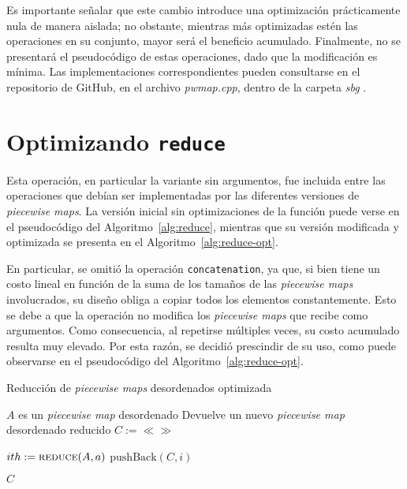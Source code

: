 Es importante señalar que este cambio introduce una optimización prácticamente nula de manera aislada; no obstante, mientras más optimizadas estén las operaciones en su conjunto, mayor será el beneficio acumulado. Finalmente, no se presentará el pseudocódigo de estas operaciones, dado que la modificación es mínima. Las implementaciones correspondientes pueden consultarse en el repositorio de GitHub, en el archivo \textit{pwmap.cpp}, dentro de la carpeta \textit{sbg} \cite{sbg}.


\section{Optimizando \texttt{reduce}}

Esta operación, en particular la variante sin argumentos, fue incluida entre las operaciones que debían ser implementadas por las diferentes versiones de \textit{piecewise maps}. La versión inicial sin optimizaciones de la función puede verse en el pseudocódigo del Algoritmo~\ref{alg:reduce}, mientras que su versión modificada y optimizada se presenta en el Algoritmo~\ref{alg:reduce-opt}.

En particular, se omitió la operación \texttt{concatenation}, ya que, si bien tiene un costo lineal en función de la suma de los tamaños de las \textit{piecewise maps} involucrados, su diseño obliga a copiar todos los elementos constantemente. Esto se debe a que la operación no modifica los \textit{piecewise maps} que recibe como argumentos. Como consecuencia, al repetirse múltiples veces, su costo acumulado resulta muy elevado. Por esta razón, se decidió prescindir de su uso, como puede observarse en el pseudocódigo del Algoritmo~\ref{alg:reduce-opt}.


\begin{algorithm}
\caption{Reducción de \textit{piecewise maps} desordenados optimizada}
\label{alg:reduce-opt}
\begin{algorithmic}[1]
\Require $A$ es un \textit{piecewise map} desordenado
\Ensure Devuelve un nuevo \textit{piecewise map} desordenado reducido
    \State $C := \ll\gg$
    
        \State $ith := \Call{reduce}{A,a}$
            \State $\mathrm{pushBack}(C,i)$
        \EndFor
    \EndFor

    \State \Return $C$
\EndFunction
\end{algorithmic}
\end{algorithm}

